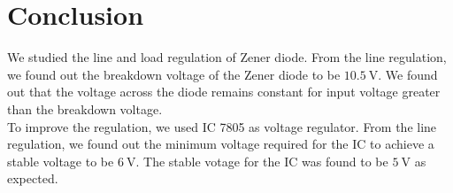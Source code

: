 \documentclass{scrartcl}
\begin{document}
\section{Conclusion}
We studied the line and load regulation of Zener diode. From the line regulation, we found out the breakdown voltage of the Zener diode to be $10.5 \ \mathrm{V}$. We found out that the voltage across the diode remains constant for input voltage greater than the breakdown voltage. \\[0.3cm]
To improve the regulation, we used IC 7805 as voltage regulator. From the line regulation, we found out the minimum voltage required for the IC to achieve a stable voltage to be $6 \ \mathrm{V}$. The stable votage for the IC was found to be $5 \ \mathrm{V}$ as expected.  
\end{document}
